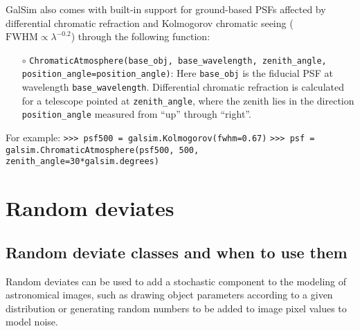 \documentclass[preprint,11pt]{../../devel/modules/aastex}
\begin{document}
GalSim also comes with built-in support for ground-based PSFs affected by differential chromatic
refraction and Kolmogorov chromatic seeing ($\mathrm{FWHM} \propto \lambda^{-0.2}$) through the
following function:
\begin{itemize}
\item[$\circ$] \texttt{ChromaticAtmosphere(base\_obj, base\_wavelength, zenith\_angle, \newline
  position\_angle=position\_angle)}:\newline
  Here \texttt{base\_obj} is the fiducial PSF at wavelength \texttt{base\_wavelength}.  Differential
chromatic refraction is calculated for a telescope pointed at \texttt{zenith\_angle}, where the
zenith lies in the direction \texttt{position\_angle} measured from ``up'' through ``right''.
\end{itemize}
For example:
\newline
{\tt >>> psf500 = galsim.Kolmogorov(fwhm=0.67)}\newline
{\tt >>> psf = galsim.ChromaticAtmosphere(psf500, 500, zenith\_angle=30*galsim.degrees)}\newline

\section{Random deviates}\label{sect:random}
\subsection{Random deviate classes and when to use them}
Random deviates can be used to add a stochastic
component to the modeling of astronomical images, such as drawing
object parameters according to a given distribution or generating random
numbers to be added to image pixel values to model noise.
\end{document}
